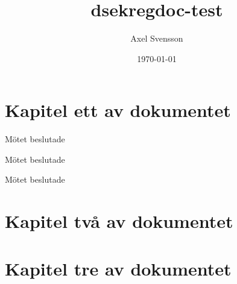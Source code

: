 \documentclass{dsekregdoc}
\date{\today}
\title{\textsf{dsekregdoc}-test}
\author{Axel Svensson}
\begin{document}
\section{Kapitel ett av dokumentet}
\begin{regsection}
  \lipsum[1]

  Mötet beslutade
  \begin{attlist}
  \item \lipsum[4][1]
  \item \lipsum[4][2]
  \end{attlist}

  \lipsum[2]

  Mötet beslutade
  \begin{attlist}
  \item \lipsum[4][3]
  \item \lipsum[4][4]

  \end{attlist}

  \lipsum[3]

  \begin{samepage}
    Mötet beslutade
    \begin{attlist}
    \item \lipsum[4][5]
    \item \lipsum[4][6]
    \end{attlist}
  \end{samepage}

\end{regsection}
\section{Kapitel två av dokumentet}
\begin{regsection}
  \lipsum[5-6]
\end{regsection}

\section{Kapitel tre av dokumentet}
\lipsum[7-8]
\end{document}
